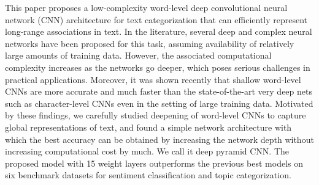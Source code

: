 This paper proposes a low-complexity word-level deep convolutional neural network (CNN) architecture for text categorization that can efficiently represent long-range associations in text.  In the literature, several deep and complex neural networks have been proposed for this task, assuming availability of relatively large amounts of training data.  However, the associated computational complexity increases as the networks go deeper, which poses serious challenges in practical applications.  Moreover, it was shown recently that shallow word-level CNNs are more accurate and much faster than the state-of-the-art very deep nets such as character-level CNNs even in the setting of large training data.  Motivated by these findings, we carefully studied deepening of word-level CNNs to capture global representations of text, and found a simple network architecture with which the best accuracy can be obtained by increasing the network depth without increasing computational cost by much.  We call it deep pyramid CNN. The proposed model with 15 weight layers outperforms the previous best models on six benchmark datasets for sentiment classification and topic categorization.
